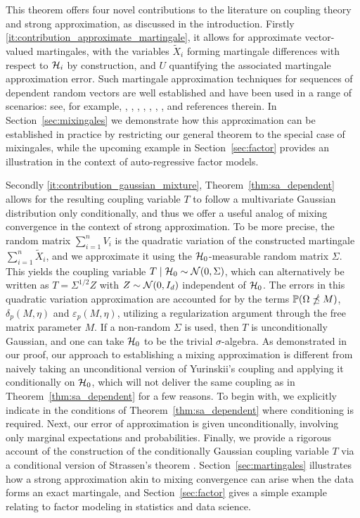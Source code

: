 This theorem offers four novel contributions to the literature on
coupling theory and strong approximation,
as discussed in the introduction.
Firstly \ref{it:contribution_approximate_martingale}, it allows for approximate
vector-valued martingales, with the variables $\tilde X_i$ forming martingale
differences with respect to $\cH_i$ by construction, and $U$ quantifying the
associated martingale approximation error. Such martingale approximation
techniques for sequences of dependent random vectors are well established and
have been used in a range of scenarios: see, for example,
\citet{wu2004martingale}, \citet{dedecker2007weak}, \citet{zhao2008martingale},
\citet{peligrad2010conditional}, \citet{atchade2014martingale},
\citet{cuny2014martingale}, \citet{magda2018martingale}, and references
therein. In Section~\ref{sec:mixingales} we demonstrate how this approximation
can be established in practice by restricting our general theorem to the
special case of mixingales, while the upcoming example in
Section~\ref{sec:factor} provides an illustration in the context of
auto-regressive factor models.

Secondly \ref{it:contribution_gaussian_mixture},
Theorem~\ref{thm:sa_dependent} allows for the
resulting coupling variable $T$
to follow a multivariate Gaussian distribution only conditionally,
and thus we offer a useful analog of mixing convergence in the context
of strong approximation.
To be more precise, the random matrix $\sum_{i=1}^{n} V_i$
is the quadratic variation of the constructed martingale
$\sum_{i=1}^n \tilde X_i$, and we approximate it using the $\cH_0$-measurable
random matrix $\Sigma$. This yields the coupling variable
$T \mid \cH_0 \sim \cN(0, \Sigma)$, which can alternatively be written as
$T=\Sigma^{1/2} Z$ with $Z \sim \cN(0,I_d)$ independent of $\cH_0$.
The errors in this quadratic variation
approximation are accounted for by the terms
$\P(\Omega \npreceq M)$, $\delta_p(M, \eta)$ and $\varepsilon_p(M, \eta)$,
utilizing a regularization argument through the free matrix parameter $M$.
If a non-random $\Sigma$ is used, then $T$ is unconditionally Gaussian,
and one can take $\cH_0$ to be the trivial $\sigma$-algebra.
As demonstrated in our proof, our approach to establishing a
mixing approximation is different from naively taking an unconditional version
of Yurinskii's coupling and applying
it conditionally on $\cH_0$, which will not deliver the same coupling as in
Theorem~\ref{thm:sa_dependent} for a few reasons.
To begin with, we explicitly indicate in the
conditions of Theorem~\ref{thm:sa_dependent} where conditioning is required.
Next, our error of approximation is given unconditionally,
involving only marginal expectations and probabilities.
Finally, we provide a rigorous account of the construction of the
conditionally Gaussian coupling variable $T$ via a conditional version
of Strassen's theorem \citep{chen2020jackknife}.
Section~\ref{sec:martingales}
illustrates how a strong approximation akin to
mixing convergence can arise when the data
forms an exact martingale, and Section~\ref{sec:factor} gives a simple example
relating to factor modeling in statistics and data science.

